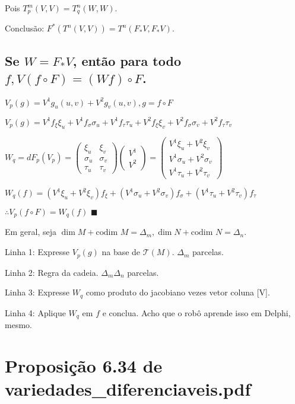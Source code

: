 \documentclass[10pt,a4paper]{article}
\begin{document}
		Pois $T_p^m(V,V) = T_q^n(W,W)$.

		Conclus\~ao: $F^*(T^n(V,V)) = T^n(F_* V, F_* V)$.

		\subsection{Se $W = F_* V$, ent\~ao para todo $f, V (f \circ F) = (Wf) \circ F$.}
		\begin{flushright}
		\end{flushright}

		$V_p(g) = V^1 g_u(u,v) + V^2 g_v(u,v), g = f \circ F$

		$V_p(g) = V^1 f_\xi \xi_u + V^1 f_\sigma \sigma_u + V^1 f_\tau \tau_u + V^2 f_\xi \xi_v + V^2 f_\sigma \sigma_v + V^2 f_\tau \tau_v$

		$W_q = dF_p (V_p) = \left(\begin{matrix} \xi_u & \xi_v \\ \sigma_u & \sigma_v \\ \tau_u & \tau_v \end{matrix}\right) \left(\begin{matrix} V^1 \\ V^2 \end{matrix}\right) = \left(\begin{matrix} V^1 \xi_u + V^2 \xi_v \\ V^1 \sigma_u + V^2 \sigma_v \\ V^1 \tau_u + V^2 \tau_v \end{matrix}\right)$

		$W_q(f) = (V^1 \xi_u + V^2 \xi_v) f_\xi + (V^1 \sigma_u + V^2 \sigma_v) f_\sigma + (V^1 \tau_u + V^2 \tau_v)  f_\tau$

		$\therefore V_p(f \circ F) = W_q(f)\,\,\blacksquare$

		\vspace{3mm}

		Em geral, seja $\dim M + \text{codim } M = \Delta_m, \dim N + \text{codim } N = \Delta_n$.

		Linha 1: Expresse $V_p(g)$ na base de $\mathcal{T}(M)$. $\Delta_m$ parcelas.

		Linha 2: Regra da cadeia. $\Delta_m \Delta_n$ parcelas.

		Linha 3: Expresse $W_q$ como produto do jacobiano vezes vetor coluna [V].

		Linha 4: Aplique $W_q$ em $f$ e conclua. Acho que o rob\^o aprende isso em Delphi, mesmo.

	\section{Proposi\c{c}\~ao 6.34 de variedades\_diferenciaveis.pdf}
		\begin{flushright}
		\end{flushright}
\end{document}
